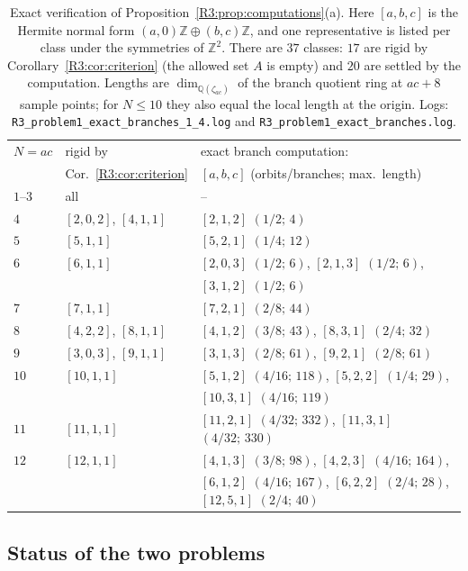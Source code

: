 \documentclass[11pt]{amsart}
\theoremstyle{definition}
\theoremstyle{remark}
\providecommand{\Q}{\mathbb Q}
\providecommand{\Z}{\mathbb Z}
\begin{document}
\begin{table}[ht]
\centering\footnotesize
\begin{tabular}{lll}
\hline
$N=ac$ & rigid by & exact branch computation:\\
 & Cor.~\ref{R3:cor:criterion} & $[a,b,c]$ (orbits/branches; max.\ length)\\
\hline
$1$--$3$ & all & --\\
$4$ & $[2,0,2]$, $[4,1,1]$ & $[2,1,2]$ $(1/2;\,4)$\\
$5$ & $[5,1,1]$ & $[5,2,1]$ $(1/4;\,12)$\\
$6$ & $[6,1,1]$ & $[2,0,3]$ $(1/2;\,6)$, $[2,1,3]$ $(1/2;\,6)$,\\
 & & $[3,1,2]$ $(1/2;\,6)$\\
$7$ & $[7,1,1]$ & $[7,2,1]$ $(2/8;\,44)$\\
$8$ & $[4,2,2]$, $[8,1,1]$ & $[4,1,2]$ $(3/8;\,43)$, $[8,3,1]$ $(2/4;\,32)$\\
$9$ & $[3,0,3]$, $[9,1,1]$ & $[3,1,3]$ $(2/8;\,61)$, $[9,2,1]$ $(2/8;\,61)$\\
$10$ & $[10,1,1]$ & $[5,1,2]$ $(4/16;\,118)$, $[5,2,2]$ $(1/4;\,29)$,\\
 & & $[10,3,1]$ $(4/16;\,119)$\\
$11$ & $[11,1,1]$ & $[11,2,1]$ $(4/32;\,332)$, $[11,3,1]$ $(4/32;\,330)$\\
$12$ & $[12,1,1]$ & $[4,1,3]$ $(3/8;\,98)$, $[4,2,3]$ $(4/16;\,164)$,\\
 & & $[6,1,2]$ $(4/16;\,167)$, $[6,2,2]$ $(2/4;\,28)$, $[12,5,1]$ $(2/4;\,40)$\\
\hline
\end{tabular}
\caption{Exact verification of Proposition~\ref{R3:prop:computations}(a). Here
$[a,b,c]$ is the Hermite normal form $(a,0)\Z\oplus(b,c)\Z$, and one
representative is listed per class under the symmetries of $\Z^2$. There are
$37$ classes: $17$ are rigid by Corollary~\ref{R3:cor:criterion} (the allowed set
$A$ is empty) and $20$ are settled by the computation.
Lengths are $\dim_{\Q(\zeta_{ac})}$ of the branch quotient ring at $ac+8$ sample
points; for $N\le10$ they also equal the local length at the origin. Logs:
\texttt{R3\_\allowbreak{}problem1\_\allowbreak{}exact\_\allowbreak{}branches\_\allowbreak{}1\_\allowbreak{}4.log} and
\texttt{R3\_\allowbreak{}problem1\_\allowbreak{}exact\_\allowbreak{}branches.log}.}
\label{R3:tab:exact}
\end{table}

\subsection{Status of the two problems}\label{R3:ss:status}
\end{document}
